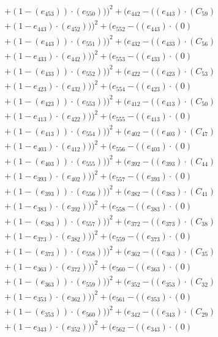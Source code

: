 \documentclass[10pt, a4paper]{article}
\begin{document}
\begin{small}
\begin{align*}
& + (1 - (e_{453})) \cdot (e_{550})))^{2} + (e_{442} - ((e_{443})  \cdot  (C_{59}) \\
& + (1 - e_{443})  \cdot  (e_{452})))^{2} + (e_{552} - ((e_{443}) \cdot (0) \\
& + (1 - (e_{443})) \cdot (e_{551})))^{2} + (e_{432} - ((e_{433})  \cdot  (C_{56}) \\
& + (1 - e_{433})  \cdot  (e_{442})))^{2} + (e_{553} - ((e_{433}) \cdot (0) \\
& + (1 - (e_{433})) \cdot (e_{552})))^{2} + (e_{422} - ((e_{423})  \cdot  (C_{53}) \\
& + (1 - e_{423})  \cdot  (e_{432})))^{2} + (e_{554} - ((e_{423}) \cdot (0) \\
& + (1 - (e_{423})) \cdot (e_{553})))^{2} + (e_{412} - ((e_{413})  \cdot  (C_{50}) \\
& + (1 - e_{413})  \cdot  (e_{422})))^{2} + (e_{555} - ((e_{413}) \cdot (0) \\
& + (1 - (e_{413})) \cdot (e_{554})))^{2} + (e_{402} - ((e_{403})  \cdot  (C_{47}) \\
& + (1 - e_{403})  \cdot  (e_{412})))^{2} + (e_{556} - ((e_{403}) \cdot (0) \\
& + (1 - (e_{403})) \cdot (e_{555})))^{2} + (e_{392} - ((e_{393})  \cdot  (C_{44}) \\
& + (1 - e_{393})  \cdot  (e_{402})))^{2} + (e_{557} - ((e_{393}) \cdot (0) \\
& + (1 - (e_{393})) \cdot (e_{556})))^{2} + (e_{382} - ((e_{383})  \cdot  (C_{41}) \\
& + (1 - e_{383})  \cdot  (e_{392})))^{2} + (e_{558} - ((e_{383}) \cdot (0) \\
& + (1 - (e_{383})) \cdot (e_{557})))^{2} + (e_{372} - ((e_{373})  \cdot  (C_{38}) \\
& + (1 - e_{373})  \cdot  (e_{382})))^{2} + (e_{559} - ((e_{373}) \cdot (0) \\
& + (1 - (e_{373})) \cdot (e_{558})))^{2} + (e_{362} - ((e_{363})  \cdot  (C_{35}) \\
& + (1 - e_{363})  \cdot  (e_{372})))^{2} + (e_{560} - ((e_{363}) \cdot (0) \\
& + (1 - (e_{363})) \cdot (e_{559})))^{2} + (e_{352} - ((e_{353})  \cdot  (C_{32}) \\
& + (1 - e_{353})  \cdot  (e_{362})))^{2} + (e_{561} - ((e_{353}) \cdot (0) \\
& + (1 - (e_{353})) \cdot (e_{560})))^{2} + (e_{342} - ((e_{343})  \cdot  (C_{29}) \\
& + (1 - e_{343})  \cdot  (e_{352})))^{2} + (e_{562} - ((e_{343}) \cdot (0) \\

\end{align*}
\end{small}
\end{document}
